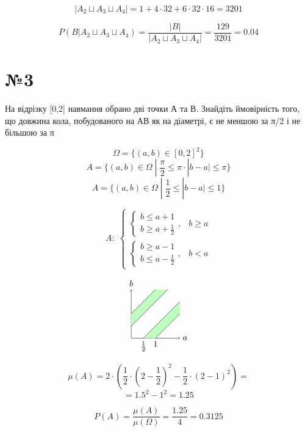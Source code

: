 \documentclass[11pt, a4paper]{article} %
\begin{document}
$$|A_2 \sqcup A_3 \sqcup A_4| = 1 + 4\cdot 32 + 6 \cdot 32\cdot 16 = 3201$$

\begin{mdframed}[style=ans]
    $$P(B|A_2 \sqcup A_3 \sqcup A_4) = \frac{|B|}{|A_2 \sqcup A_3 \sqcup A_4|} = \frac{129}{3201} = 0.04$$
\end{mdframed}

\section*{№3}
\begin{mdframed}
    На відрізку [0,2] навмання обрано дві точки А та В. Знайдіть ймовірність
того, що довжина кола, побудованого на АВ як на діаметрі, є не меншою за
π/2 і не більшою за π
\end{mdframed}

$$\Omega = \{(a,b)\in [0,2]^2\}$$
$$A = \{(a,b)\in\Omega\;|\; \frac{\pi}{2} \le \pi \cdot |b-a| \le \pi \}$$
$$A = \{(a,b)\in\Omega\;|\; \frac{1}{2} \le |b-a| \le 1 \}$$

$$A:\; \begin{cases}
    \begin{cases}
        b \le a + 1\\
        b \ge a + \frac{1}{2}
    \end{cases},& b\ge a \\
    \begin{cases}
        b \ge a - 1\\
        b \le a - \frac{1}{2}
    \end{cases},& b<a
\end{cases}$$

$$
\begin{tikzpicture}
    \draw[->] (0,0) -- (2,0) node[right] {$a$};
    \draw[->] (0,0) -- (0,2) node[above] {$b$};
    \fill[green!25] (0,1) -- (1,2) -- (1.5,2) -- (0,0.5) -- cycle;
    \draw (0,1) -- (1,2);
    \draw (0,0.5) -- (1.5,2);
    \fill[green!25] (1,0) -- (2,1) -- (2,1.5) -- (0.5,0) -- cycle;
    \draw (0.5,0) node[below] {$\frac{1}{2}$} -- (2,1.5);
    \draw (1,0) node [below] {$1$} -- (2,1);
\end{tikzpicture}
$$

$$\mu(A) = 2 \cdot (\frac{1}{2}\cdot (2-\frac{1}{2})^2 - \frac{1}{2}\cdot (2-1)^2) = $$
$$= 1.5^2 - 1^2 = 1.25$$

\begin{mdframed}[style=ans]
    
    $$P(A) = \frac{\mu(A)}{\mu(\Omega)} = \frac{1.25}{4} = 0.3125$$
\end{mdframed}
\end{document}
